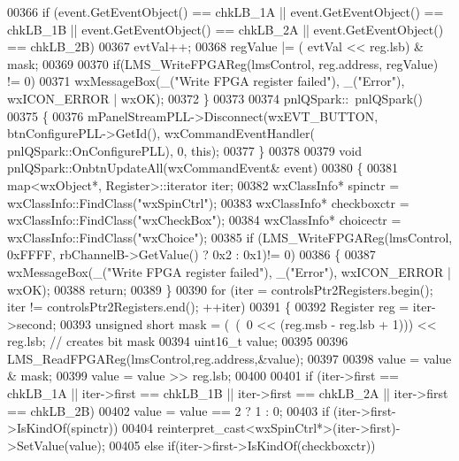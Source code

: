 \begin{DoxyCode}
{{00366     \textcolor{keywordflow}{if} (event.GetEventObject() == chkLB_1A || \textcolor{keyword}{event}.GetEventObject() == chkLB_1B || \textcolor{keyword}{event}.GetEventObject() 
      == chkLB_2A || \textcolor{keyword}{event}.GetEventObject() == chkLB_2B)
00367         evtVal++;
00368     regValue |= ( evtVal << reg.lsb) & mask;
00369 
00370     \textcolor{keywordflow}{if}(LMS_WriteFPGAReg(lmsControl, reg.address, regValue) != 0)
00371         wxMessageBox(\_(\textcolor{stringliteral}{"Write FPGA register failed"}), \_(\textcolor{stringliteral}{"Error"}), wxICON\_ERROR | wxOK);
00372 \}
00373 
00374 pnlQSpark::~pnlQSpark()
00375 \{
00376     mPanelStreamPLL->Disconnect(wxEVT\_BUTTON, btnConfigurePLL->GetId(), wxCommandEventHandler(
      pnlQSpark::OnConfigurePLL), 0, \textcolor{keyword}{this});
00377 \}
00378 
00379 \textcolor{keywordtype}{void} pnlQSpark::OnbtnUpdateAll(wxCommandEvent& event)
00380 \{
00381     map<wxObject*, Register>::iterator iter;
00382     wxClassInfo* spinctr = wxClassInfo::FindClass(\textcolor{stringliteral}{"wxSpinCtrl"});
00383     wxClassInfo* checkboxctr = wxClassInfo::FindClass(\textcolor{stringliteral}{"wxCheckBox"});
00384     wxClassInfo* choicectr = wxClassInfo::FindClass(\textcolor{stringliteral}{"wxChoice"});
00385     \textcolor{keywordflow}{if} (LMS_WriteFPGAReg(lmsControl, 0xFFFF, rbChannelB->GetValue() ? 0x2 : 0x1)!= 0)
00386     \{
00387         wxMessageBox(\_(\textcolor{stringliteral}{"Write FPGA register failed"}), \_(\textcolor{stringliteral}{"Error"}), wxICON\_ERROR | wxOK); 
00388         \textcolor{keywordflow}{return}; 
00389     \}
00390     \textcolor{keywordflow}{for} (iter = controlsPtr2Registers.begin(); iter != controlsPtr2Registers.end(); ++iter)
00391     \{
00392         Register reg = iter->second;
00393         \textcolor{keywordtype}{unsigned} \textcolor{keywordtype}{short} mask = (~(~0 << (reg.msb - reg.lsb + 1))) << reg.lsb; \textcolor{comment}{// creates bit mask}
00394         uint16\_t value;
00395 
00396         LMS_ReadFPGAReg(lmsControl,reg.address,&value);
00397 
00398         value = value & mask;
00399         value = value >> reg.lsb;
00400         
00401         \textcolor{keywordflow}{if} (iter->first == chkLB_1A || iter->first == chkLB_1B || iter->first == 
      chkLB_2A || iter->first == chkLB_2B)
00402             value = value == 2 ? 1 : 0;
00403         \textcolor{keywordflow}{if} (iter->first->IsKindOf(spinctr))
00404             reinterpret\_cast<wxSpinCtrl*>(iter->first)->SetValue(value);
00405         \textcolor{keywordflow}{else} \textcolor{keywordflow}{if}(iter->first->IsKindOf(checkboxctr))
}}
\end{DoxyCode}
